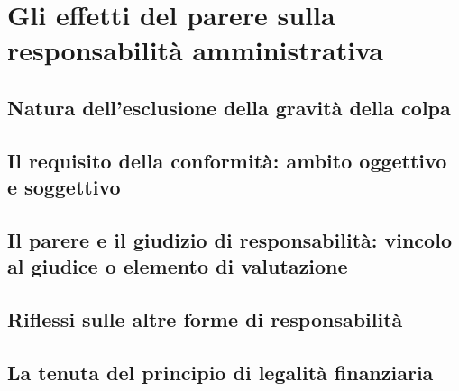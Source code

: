 
\chapter{Gli effetti del parere sulla responsabilità amministrativa}
\label{cap:cap5}

\section{Natura dell'esclusione della gravità della colpa}
\label{sez:cap5:natura}


\section{Il requisito della conformità: ambito oggettivo e soggettivo}
\label{sez:cap5:conformita}


\section{Il parere e il giudizio di responsabilità: vincolo al giudice o elemento di valutazione}
\label{sez:cap5:vincolo}


\section{Riflessi sulle altre forme di responsabilità}
\label{sez:cap5:altreresponsabilita}


\section{La tenuta del principio di legalità finanziaria}
\label{sez:cap5:legalita}


